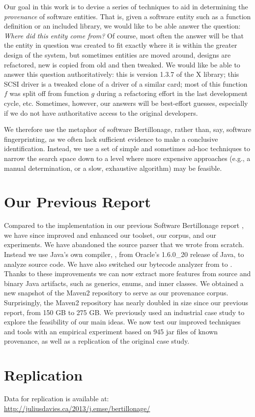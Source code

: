 Our goal in this work is to devise a series of techniques to aid in
determining the \emph{provenance} of software entities.  That is, given a
software entity such as a function definition or an included library, we
would like to be able answer the question:  \emph{Where did this entity
come from?}  Of course, most often the answer will be that the entity in
question was created to fit exactly where it is within the greater design
of the system, but sometimes entities are moved around, designs are
refactored, new is copied from old and then tweaked.  We would like be able
to answer this question authoritatively: this is version 1.3.7 of the X
library; this SCSI driver is a tweaked clone of a driver of a similar card;
most of this function $f$ was split off from function $g$ during a
refactoring effort in the last development cycle, etc.  Sometimes, however,
our answers will be best-effort guesses, especially if we do not have
authoritative access to the original developers.

We therefore use the metaphor of software Bertillonage, rather than, say,
software fingerprinting, as we often lack sufficient evidence to make a
conclusive identification.  Instead, we use a set of simple and sometimes
ad-hoc techniques to narrow the search space down to a level where
more expensive approaches (e.g., a manual determination, or a slow, exhaustive
algorithm) may be feasible.

\section{Our Previous Report}

Compared to the implementation in our previous Software Bertillonage report
\cite{DaviesGGH11}, we have since improved and enhanced our toolset, our
corpus, and our experiments.  We have abandoned the source parser that we wrote
from scratch.  Instead we use Java's own compiler, , from
Oracle's 1.6.0\_20 release of Java, to
analyze source code.  We have also switched our bytecode analyzer from
 to .  Thanks to these improvements we can
now extract more features from source and binary Java artifacts, such as generics, enums, and
inner classes.  We obtained a new snapshot of the Maven2 repository to
serve as our provenance corpus.  Surprisingly, the Maven2 repository has
nearly doubled in size since our previous report, from 150 GB to 275 GB.
We previously used an industrial case study to explore the feasibility of our
main ideas.  We now test our improved techniques and tools with an
empirical experiment based on 945 jar files of known provenance, as well as
a replication of the original case study.


\section{Replication}
\noindent Data for replication is available at:\\
\url{http://juliusdavies.ca/2013/j.emse/bertillonage/}
